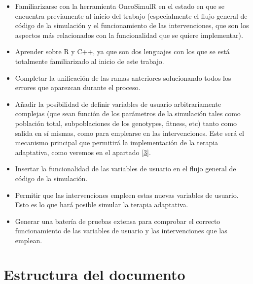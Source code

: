\begin{itemize}
	\item Familiarizarse con la herramienta OncoSimulR en el estado en que se encuentra previamente al inicio del trabajo (especialmente el flujo general de código de la simulación y el funcionamiento de las intervenciones, que son los aspectos más relacionados con la funcionalidad que se quiere implementar).
	\item Aprender sobre R y C++, ya que son dos lenguajes con los que se está totalmente familiarizado al inicio de este trabajo.
	\item Completar la unificación de las ramas anteriores solucionando todos los errores que aparezcan durante el proceso.
	\item Añadir la posibilidad de definir variables de usuario arbitrariamente complejas (que sean función de los parámetros de la simulación tales como población total, subpoblaciones de los \glspl{genotype}, \gls{fitness}, etc) tanto como salida en sí mismas, como para emplearse en las intervenciones. Este será el mecanismo principal que permitirá la implementación de la terapia adaptativa, como veremos en el apartado \ref{3}.
	\item Insertar la funcionalidad de las variables de usuario en el flujo general de código de la simulación.
	\item Permitir que las intervenciones empleen estas nuevas variables de usuario. Esto es lo que hará posible simular la terapia adaptativa.
	\item Generar una batería de pruebas extensa para comprobar el correcto funcionamiento de las variables de usuario y las intervenciones que las emplean.
\end{itemize}

\section{Estructura del documento}\label{1.3}

